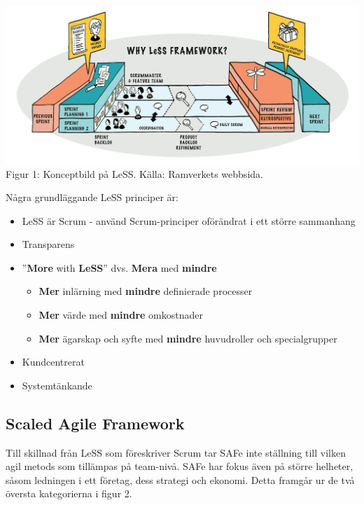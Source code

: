 		\begin{center}	
			\includegraphics{Material/less_framework.png}
		\\ Figur 1: Konceptbild på LeSS. Källa: Ramverkets webbsida. \cite{less_web}
		\end{center}
	
		Några grundläggande LeSS principer är: \cite{less_principles}
	
		\begin{itemize}
			\setlength{\itemsep}{1pt}
			\item LeSS är Scrum - använd Scrum-principer oförändrat i ett större sammanhang			
			\item Transparens
			\item ''\textbf{More} with \textbf{LeSS}'' dvs. \textbf{Mera} med \textbf{mindre}
				\begin{itemize}
					\item \textbf{Mer} inlärning med \textbf{mindre} definierade processer
					\item \textbf{Mer} värde med \textbf{mindre} omkostnader
					\item \textbf{Mer} ägarskap och syfte med \textbf{mindre} huvudroller och specialgrupper
				\end{itemize}
			\item Kundcentrerat
			\item Systemtänkande
		\end{itemize}
			
	\subsection{Scaled Agile Framework}
		
		Till skillnad från LeSS som föreskriver Scrum tar SAFe inte ställning till vilken agil metods som tillämpas på team-nivå.
		SAFe har fokus även på större helheter, såsom ledningen i ett företag, dess strategi och ekonomi. Detta framgår ur de två översta kategorierna i figur 2. \cite{safe_intro}
		

